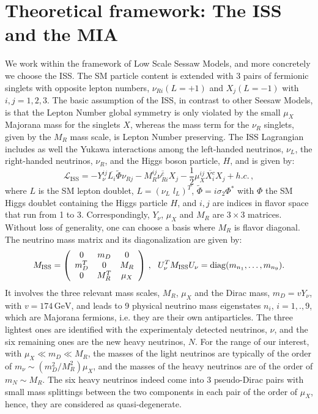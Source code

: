 \documentclass{PoS}
\begin{document}
\section{Theoretical framework: The ISS and the MIA}
We work within the framework of Low Scale Sessaw Models, and more concretely we choose the ISS. The SM particle content is extended with 3 pairs of fermionic singlets with opposite lepton numbers, $\nu_{Ri}(L=+1)$ and $X_j(L=-1)$ with $i,j=1,2,3$. The basic assumption of the ISS, in contrast to other Seesaw Models, is that the Lepton Number global symmetry is only violated by the small $\mu_X$ Majorana mass for the singlets $X$, whereas the mass term for the $\nu_{R}$ singlets, given by the $M_R$ mass scale, is Lepton Number preserving. The ISS Lagrangian includes as well the Yukawa interactions among the left-handed neutrinos, $\nu_{L}$, the right-handed neutrinos, $\nu_{R}$, and the Higgs boson particle, $H$, and is given by:    
\begin{equation}
 \label{ISSlagrangian}
 \mathcal{L}_\mathrm{ISS} = - Y^{ij}_\nu \overline{L_{i}} \widetilde{\Phi} \nu_{Rj} - M_R^{ij} \overline{\nu_{Ri}^c} X_j - \frac{1}{2} \mu_{X}^{ij} \overline{X_{i}^c} X_{j} + h.c.\,, 
\end{equation}
where $L$ is the SM lepton 
doublet, $L= (\nu_L\,\, l_L)^T$,  $\widetilde{\Phi}=i\sigma_2\Phi^*$ with $\Phi$ the SM Higgs doublet containing the Higgs particle $H$, and 
$i,j$ are indices in flavor space that run from 1 to 3. Correspondingly, $Y_\nu$, $\mu_{X}$ and $M_R$ are $3\times 3$ matrices. Without loss of generality, one can choose a basis where $M_R$ is flavor diagonal. 
The neutrino mass matrix and its diagonalization are given by:
\begin{equation}
\label{ISSmatrix}
 M_{\mathrm{ISS}}=\left(\begin{array}{c c c} 0 & m_D & 0 \\ m_D^T & 0 & M_R \\ 0 & M_R^T & \mu_X \end{array}\right)\,,\,\,\,\,
 U_\nu^T M_{\rm ISS} U_\nu = {\rm diag}(m_{n_1},\dots,m_{n_9}). 
\end{equation}
It involves the three relevant mass scales, $M_R$, $\mu_X$ and the Dirac mass, $m_D=v Y_\nu$, with $v = 174\,\mathrm{GeV}$, and  
leads to 9 physical neutrino mass eigenstates $n_i$, $i=1,.,9$, which are Majorana fermions, i.e. they are their own antiparticles. The three lightest ones are identified with the experimentaly detected neutrinos, $\nu$, and the six remaining ones are the new heavy neutrinos, $N$. For the range of our interest, with $\mu_X \ll m_D \ll M_R$, the masses of the light neutrinos are typically of the order of
$m_\nu \sim (m_D^2/M_R^2) \mu_X$, and the masses of the heavy neutrinos are of the order of $m_N \sim M_R$. The six heavy neutrinos indeed come into 3 pseudo-Dirac pairs with small mass splittings between the two components in each pair of the order of $\mu_X$, hence, they are considered as quasi-degenerate.   
\end{document}
